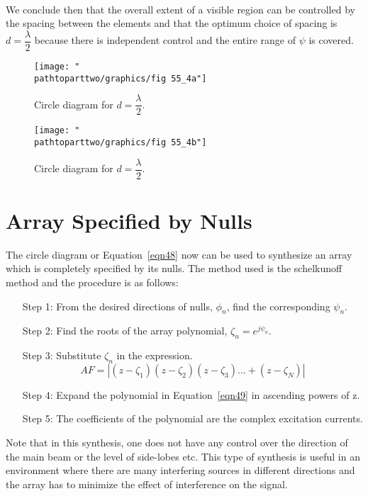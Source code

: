 \paragraph{}
We conclude then that the overall extent of a visible region can be controlled by the spacing between the elements and that the optimum choice of spacing is $d=\dfrac{\lambda}{2}$ because there is independent control and the entire range of $\psi$ is covered.
\begin{figure}[h]
\centering
\begin{minipage}[b]{0.4\textwidth}
\texttt{[image: "\\pathtoparttwo/graphics/fig 55\_4a"]}
\caption{Circle diagram for $d=\dfrac{\lambda}{2}$.}
\label{fig:fig-55_4a}
\end{minipage}
\hfill
\begin{minipage}[b]{0.4\textwidth}
\texttt{[image: "\\pathtoparttwo/graphics/fig 55\_4b"]}
\caption{Circle diagram for $d=\dfrac{\lambda}{2}$.}
\label{fig:fig-55_4a}
\end{minipage}
\end{figure}

\section{Array Specified by Nulls}
The circle diagram or Equation~\ref{eqn48} now can be used to synthesize an array which is completely specified by its nulls. The method used is the schelkunoff method and the procedure is as follows: 

\begin{enumerate}
\item[Step 1:] From the desired directions of nulls, $\phi_{n}$, find the corresponding $\psi_{n}$.
\item[Step 2:] Find the roots of the array polynomial, $\zeta
_n = e^{j\psi_{n}}$.
\item[Step 3:] Substitute $\zeta_n$ in the expression.
\begin{equation}
AF=|(z-\zeta_1)(z-\zeta_2)(z-\zeta_3)...+(z-\zeta_N)|
\label{eqn49}
\end{equation}
\item[Step 4:] Expand the polynomial in Equation~\ref{eqn49} in ascending powers of z.
\item[Step 5:] The coefficients of the polynomial are the complex excitation currents.
\end{enumerate}

Note that in this synthesis, one does not have any control over the direction of the main beam or the level of side-lobes etc. This type of synthesis is useful in an environment where there are many interfering sources in different directions and the array has to minimize the effect of interference on the signal.

